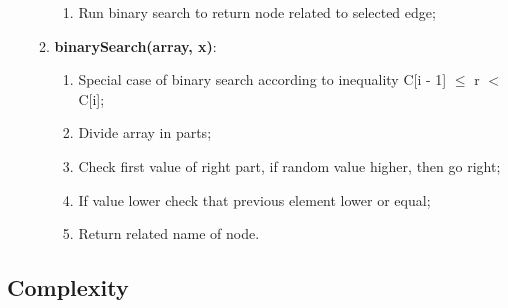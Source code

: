 \begin{itemize}
\begin{enumerate}
\begin{enumerate}
			\item  Run binary search  to return node related to selected edge;
			\end{enumerate}
		\item  \textbf{binarySearch(array, x)}:
			\begin{enumerate}
			\item  Special case of binary search according to inequality C[i - 1] $\leq$ r $<$ C[i];
			\item  Divide array in parts;
			\item  Check first value of right part, if random value higher, then go right;
			\item  If value lower check that previous element lower or equal;
			\item  Return related name of node.
			\end{enumerate}
	\end{enumerate}

\end{itemize}



\subsection{Complexity}



\pagebreak
